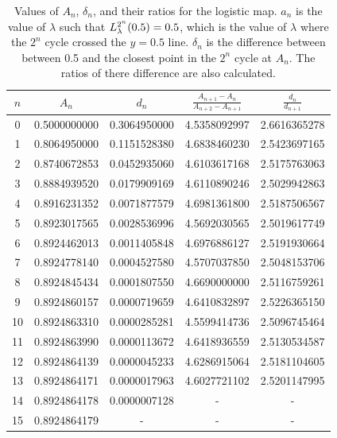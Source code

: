 \begin{table}
\centering
\begin{tabular}{|c|c|c|c|c|}
\hline
\( n \) & \( A_n \) & \( d_n \)  & \(\frac{A_{n+1} - A_n}{A_{n+2} - A_{n+1}}\)  &  \(\frac{d_n}{d_{n+1}}\) \\ \hline
0 & 0.5000000000 & 0.3064950000 & 4.5358092997 & 2.6616365278 \\
1 & 0.8064950000 & 0.1151528380 & 4.6838460230 & 2.5423697165 \\
2 & 0.8740672853 & 0.0452935060 & 4.6103617168 & 2.5175763063 \\
3 & 0.8884939520 & 0.0179909169 & 4.6110890246 & 2.5029942863 \\
4 & 0.8916231352 & 0.0071877579 & 4.6981361800 & 2.5187506567 \\
5 & 0.8923017565 & 0.0028536996 & 4.5692030565 & 2.5019617749 \\
6 & 0.8924462013 & 0.0011405848 & 4.6976886127 & 2.5191930664 \\
7 & 0.8924778140 & 0.0004527580 & 4.5707037850 & 2.5048153706 \\
8 & 0.8924845434 & 0.0001807550 & 4.6690000000 & 2.5116759261 \\
9 & 0.8924860157 & 0.0000719659 & 4.6410832897 & 2.5226365150 \\
10 & 0.8924863310 & 0.0000285281 & 4.5599414736 & 2.5096745464 \\
11 & 0.8924863990 & 0.0000113672 & 4.6418936559 & 2.5130534587 \\
12 & 0.8924864139 & 0.0000045233 & 4.6286915064 & 2.5181104605 \\
13 & 0.8924864171 & 0.0000017963 & 4.6027721102 & 2.5201147995 \\
14 & 0.8924864178 & 0.0000007128 &  - &  - \\
15 & 0.8924864179 &  - &  - &  - \\
\hline
\end{tabular}
\caption{
	Values of \( A_n \), \( \delta_n \), and their ratios for the logistic map.
	$a_n$ is the value of $\lambda$ such that $L_{\lambda}^{2^n}(0.5) = 0.5$, which is the value of $\lambda$ where the $2^n$ cycle crossed the $y=0.5$ line. 
	$\delta_n$ is the difference between between 0.5 and the closest point in the $2^n$ cycle at $A_n$.
	The ratios of there difference are also calculated.
}
\label{tab:feigenbuam_alpha_table_for_logistic}
\end{table}

